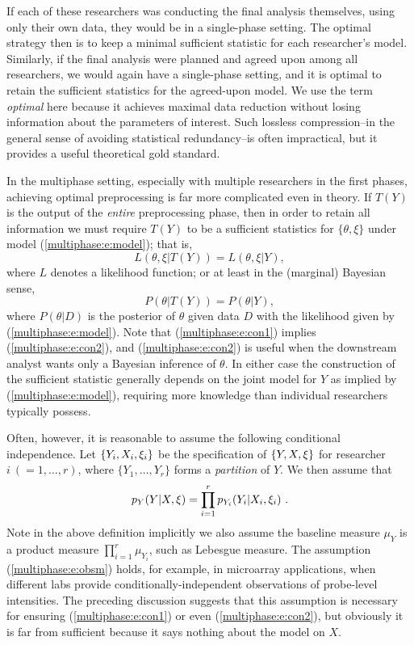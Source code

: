 If each of these researchers was conducting the final analysis themselves, using only their own data, they would be in a single-phase setting.
The optimal strategy then is  to keep a minimal sufficient statistic for each researcher's model. 
Similarly, if the final analysis were planned and agreed upon among all researchers, we would again have a single-phase setting,  and  it is optimal to retain the sufficient statistics for the agreed-upon model.
We use the term \textit{optimal} here because it achieves maximal data reduction without losing information about the parameters of interest.
Such lossless compression--in the general sense of avoiding statistical redundancy--is often impractical, but it provides a useful theoretical gold standard.%

In the multiphase setting, especially with multiple researchers in the first phases, achieving optimal preprocessing is far more complicated even in theory.
If $T(Y)$ is  the output of the \textit{entire} preprocessing phase, then in order to retain all information we must require $T(Y)$ to be a sufficient statistics for $\{\theta,\xi\}$ under model (\ref{multiphase:e:model}); that is, 
\begin{equation}\label{multiphase:e:con1}  
L(\theta,\xi|T(Y))=L(\theta,\xi|Y),
\end{equation}
where $L$ denotes a likelihood function;  or at least in the (marginal) Bayesian sense,
\begin{equation}\label{multiphase:e:con2}
P(\theta|T(Y))=P(\theta|Y),
\end{equation}
where $P(\theta|D)$ is the posterior of $\theta$ given data $D$ with the likelihood given by  (\ref{multiphase:e:model}).
Note  that (\ref{multiphase:e:con1}) implies (\ref{multiphase:e:con2}), and (\ref{multiphase:e:con2}) is useful when the downstream analyst wants only a Bayesian inference of $\theta$.
In either case the construction of the sufficient statistic generally depends on the joint model for $Y$ as implied by (\ref{multiphase:e:model}), requiring more knowledge than individual researchers typically possess.

Often, however, it is reasonable to assume the following conditional independence.
Let $\{Y_i, X_i, \xi_i\}$ be the specification of $\{Y, X, \xi\}$ for researcher $i\ (=1,\ldots, r)$, where $\{Y_1,\ldots, Y_r\}$ forms a \textit{partition} of $Y$.  We then assume that
\begin{equation}\label{multiphase:e:obsm}
 \pobs(Y | X, \obsparam)= \prod_{i=1}^r p_{Y_i}(Y_i | X_i, \obsparam_i)\ .
\end{equation}
Note in the above definition implicitly we also assume the baseline measure $\mu_Y$ is a product measure $\prod_{i=1}^r \mu_{Y_i}$, such as Lebesgue measure.
The assumption (\ref{multiphase:e:obsm}) holds, for example, in microarray applications, when different labs provide conditionally-independent observations of probe-level intensities.
The preceding discussion suggests that this assumption is necessary for ensuring (\ref{multiphase:e:con1}) or even (\ref{multiphase:e:con2}), but obviously it is far from sufficient because it says nothing about the model on $X$.

